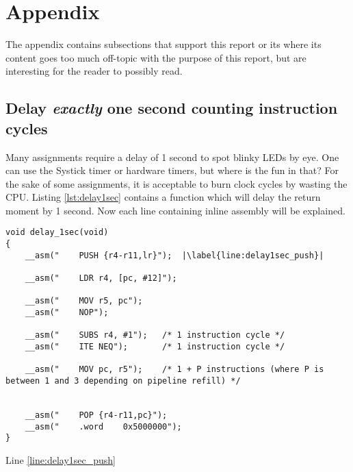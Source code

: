 \section{Appendix}

The appendix contains subsections that support this report or its where its content goes too much off-topic with the purpose of 
this report, but are interesting for the reader to possibly read.

\subsection{Delay \textit{exactly} one second counting instruction cycles}

Many assignments require a delay of 1 second to spot blinky LEDs by eye.
One can use the Systick timer or hardware timers, but where is the fun in that?
For the sake of some assignments, it is acceptable to burn clock cycles by wasting the CPU.
Listing \ref{lst:delay1sec} contains a function which will delay the return moment by 1 second.
Now each line containing inline assembly will be explained.

\begin{lstlisting}[style=CStyle, caption={C function containing inline assembly to perform a delay of \textit{exactly} one second}, captionpos=b, label={lst:delay1sec}, escapechar=|]
void delay_1sec(void)
{
    __asm("    PUSH {r4-r11,lr}");  |\label{line:delay1sec_push}|
 
    __asm("    LDR r4, [pc, #12]");
   
    __asm("    MOV r5, pc");
    __asm("    NOP");
     
    __asm("    SUBS r4, #1");   /* 1 instruction cycle */
    __asm("    ITE NEQ");       /* 1 instruction cycle */
   
    __asm("    MOV pc, r5");    /* 1 + P instructions (where P is between 1 and 3 depending on pipeline refill) */
     
     
    __asm("    POP {r4-r11,pc}");
    __asm("    .word    0x5000000");
}
\end{lstlisting}

Line \ref{line:delay1sec_push} 

